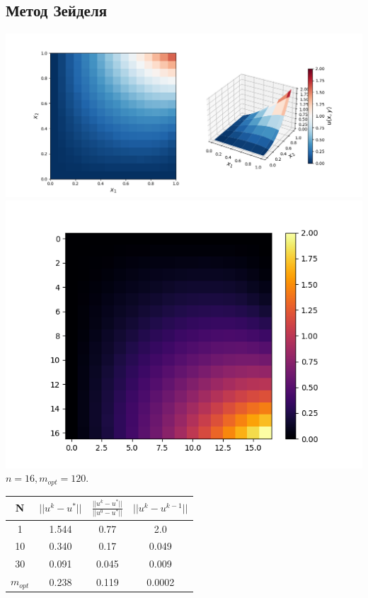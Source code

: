 \documentclass[a4paper, 12pt]{article}
\begin{document}
	\newpage
	\subsection{Метод Зейделя}
	
	\begin{center}
		\includegraphics[scale=0.5]{plot22_1.png} \\
		\includegraphics[scale=0.4]{plot22_2.png} \\
		 $n = 16, m_{opt} = 120$.
	\end{center}
	
	\begin{center}
		\begin{tabular}{||c c c c||} 
			\hline
			N & $||u^k-u^*||$ & $\frac{||u^k-u^*||}{||u^0-u^*||}$ & $||u^k-u^{k-1}||$ \\ [0.5ex] 
			\hline\hline
			1 & 1.544 & 0.77 & 2.0 \\ 
			\hline
			10 & 0.340 & 0.17 & 0.049 \\
			\hline
			30 & 0.091 & 0.045 & 0.009 \\
			\hline
			$m_{opt}$ & 0.238 & 0.119 & 0.0002 \\ [1ex] 
			\hline
		\end{tabular}
	\end{center}
\end{document}
